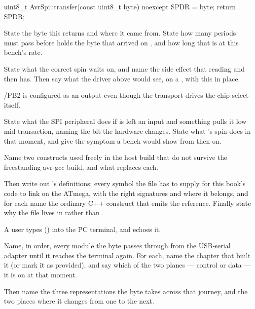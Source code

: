 \begin{cppcode}
uint8_t AvrSpi::transfer(const uint8_t byte) noexcept
{
    SPDR = byte;
    return SPDR;
}
\end{cppcode}

\noindent State the byte this returns and where it came from. State how many  periods must
pass before  holds the byte that arrived on , and how long that is at this
bench's  rate.

State what the correct spin waits on, and name the side effect that reading  and then
 has. Then say what the driver above would see, on a , with this
 in place. 

 /PB2 is configured as an output even though the transport drives the chip select
itself.

State what the SPI peripheral does if  is left an input and something pulls it low mid
transaction, naming the  bit the hardware changes. State what 's spin
does in that moment, and give the symptom a bench would show from then on. 

 Name two constructs used freely in the host build that do not survive the freestanding
avr-gcc build, and what replaces each.

Then write out 's definitions: every symbol the file has to supply for this book's
code to link on the ATmega, with the right signatures and  where it belongs, and
for each name the ordinary C++ construct that emits the reference. Finally state why the file lives
in  rather than . 

\label{exa:q:8}

 A user types  () into the PC terminal, and  echoes
it.

Name, in order, every module the byte passes through from the USB-serial adapter until it reaches
the terminal again. For each, name the chapter that built it (or mark it as provided), and say which
of the two planes --- control or data --- it is on at that moment.

Then name the three representations the byte takes across that journey, and the two places where it
changes from one to the next. 

